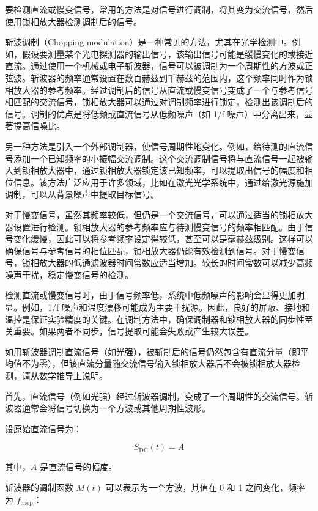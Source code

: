 要检测直流或慢变信号，常用的方法是对信号进行调制，将其变为交流信号，然后使用锁相放大器检测调制后的信号。

斩波调制（Chopping modulation）是一种常见的方法，尤其在光学检测中。例如，假设要测量某个光电探测器的输出信号，该输出信号可能是缓慢变化的或接近直流。通过使用一个机械或电子斩波器，信号可以被调制为一个周期性的方波或正弦波。斩波器的频率通常设置在数百赫兹到千赫兹的范围内，这个频率同时作为锁相放大器的参考频率。经过调制后的信号从直流或慢变信号变成了一个与参考信号相匹配的交流信号，锁相放大器可以通过对调制频率进行锁定，检测出该调制后的信号。调制的优点是将低频或直流信号从低频噪声（如 1/f 噪声）中分离出来，显著提高信噪比。

另一种方法是引入一个外部调制器，使信号周期性地变化。例如，给待测的直流信号添加一个已知频率的小振幅交流调制。这个交流调制信号将与直流信号一起被输入到锁相放大器中，通过锁相放大器锁定该已知频率，可以提取出信号的幅度和相位信息。该方法广泛应用于许多领域，比如在激光光学系统中，通过给激光源施加调制，可以从背景噪声中提取目标信号。

对于慢变信号，虽然其频率较低，但仍是一个交流信号，可以通过适当的锁相放大器设置进行检测。锁相放大器的参考频率应与待测慢变信号的频率相匹配。由于信号变化缓慢，因此可以将参考频率设定得较低，甚至可以是毫赫兹级别。这样可以确保信号与参考信号的相位匹配，锁相放大器仍能有效检测到信号。对于慢变信号，锁相放大器的低通滤波器时间常数应适当增加。较长的时间常数可以减少高频噪声干扰，稳定慢变信号的检测。

检测直流或慢变信号时，由于信号频率低，系统中低频噪声的影响会显得更加明显。例如，1/f 噪声和温度漂移可能成为主要干扰源。因此，良好的屏蔽、接地和温控是保证实验精度的关键。在调制方法中，确保调制器和锁相放大器的同步性至关重要。如果两者不同步，信号提取可能会失败或产生较大误差。

\begin{question}
	如用斩波器调制直流信号（如光强），被斩制后的信号仍然包含有直流分量（即平均值不为零），但该直流分量随交流信号输入锁相放大器后不会被锁相放大器检测，请从数学推导上说明。
\end{question}
首先，直流信号（例如光强）经过斩波器调制，变成了一个周期性的交流信号。斩波器通常会将信号切换为一个方波或其他周期性波形。

设原始直流信号为：

\[
S_{\text{DC}}(t) = A
\]

其中，\( A \) 是直流信号的幅度。

斩波器的调制函数 \( M(t) \) 可以表示为一个方波，其值在 0 和 1 之间变化，频率为 \( f_{\text{chop}} \)：

